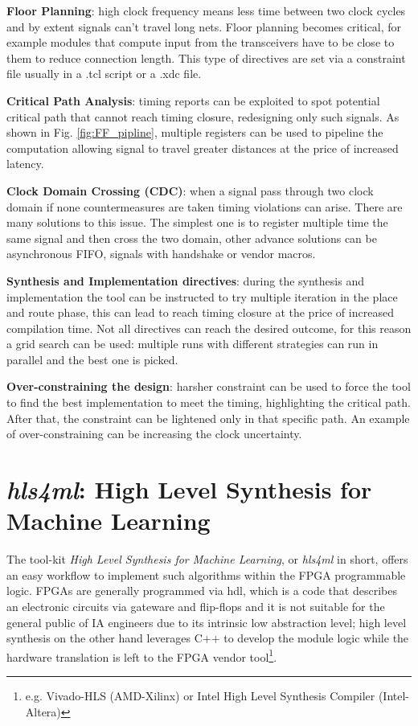 \documentclass[../../main.tex]{subfiles}
\begin{document}
\textbf{Floor Planning}: high clock frequency means less time between two clock cycles and by extent signals can't travel long nets. Floor planning becomes critical, for example modules that compute input from the transceivers have to be close to them to reduce connection length. This type of directives are set via a constraint file usually in a .tcl script or a .xdc file.  

\textbf{Critical Path Analysis}: timing reports can be exploited to spot potential critical path that cannot reach timing closure, redesigning only such signals. As shown in Fig. \ref{fig:FF_pipline}, multiple registers can be used to pipeline the computation allowing signal to travel greater distances at the price of increased latency.

\textbf{Clock Domain Crossing (CDC)}: when a signal pass through two clock domain if none countermeasures are taken timing violations can arise. There are many solutions to this issue. The simplest one is to register multiple time the same signal and then cross the two domain, other advance solutions can be asynchronous FIFO, signals with handshake or vendor macros.

\textbf{Synthesis and Implementation directives}: during the synthesis and implementation the tool can be instructed to try multiple iteration in the place and route phase, this can lead to reach timing closure at the price of increased compilation time. Not all directives can reach the desired outcome, for this reason a grid search can be used: multiple runs with different strategies can run in parallel and the best one is picked.

\textbf{Over-constraining the design}: harsher constraint can be used to force the tool to find the best implementation to meet the timing, highlighting the critical path. After that, the constraint can be lightened only in that specific path. An example of over-constraining can be increasing the clock uncertainty.
    
\section{\textit{hls4ml}: High Level Synthesis for Machine Learning}
\label{sec:FPGA_hls4ml}
The tool-kit \textit{High Level Synthesis for Machine Learning}, or \textit{hls4ml} in short, offers an easy workflow to implement such algorithms within the FPGA programmable logic. FPGAs are generally programmed via \acrfull{hdl}, which is a code that describes an electronic circuits via gateware and flip-flops and it is not suitable for the general public of IA engineers due to its intrinsic low abstraction level; high level synthesis on the other hand leverages C++ to develop the module logic while the hardware translation is left to the FPGA vendor tool\footnote{e.g. Vivado-HLS (AMD-Xilinx) or Intel High Level Synthesis Compiler (Intel-Altera)}.  
    
\end{document}
